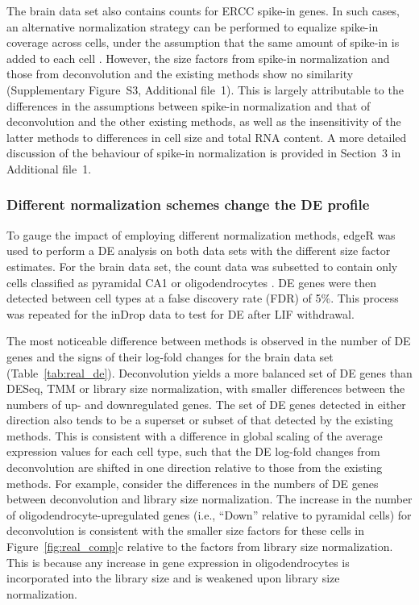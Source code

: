 \documentclass{bmcart}
\newcommand{\suppspikesec}{3}
\newcommand{\suppspikefig}{S3}
\begin{document}
The brain data set also contains counts for ERCC spike-in genes.
In such cases, an alternative normalization strategy can be performed to equalize spike-in coverage across cells, 
    under the assumption that the same amount of spike-in is added to each cell \cite{stegle2015computational}.
However, the size factors from spike-in normalization and those from deconvolution and the existing methods show no similarity (Supplementary Figure~\suppspikefig{}, Additional file~1).
This is largely attributable to the differences in the assumptions between spike-in normalization and that of deconvolution and the other existing methods,
    as well as the insensitivity of the latter methods to differences in cell size and total RNA content.
A more detailed discussion of the behaviour of spike-in normalization is provided in Section~\suppspikesec{} in Additional file~1.

\subsubsection*{Different normalization schemes change the DE profile}
To gauge the impact of employing different normalization methods, edgeR was used to perform a DE analysis on both data sets with the different size factor estimates. 
For the brain data set, the count data was subsetted to contain only cells classified as pyramidal CA1 or oligodendrocytes \cite{zeisel2015brain}.
DE genes were then detected between cell types at a false discovery rate (FDR) of 5\%.
This process was repeated for the inDrop data to test for DE after LIF withdrawal.

The most noticeable difference between methods is observed in the number of DE genes and the signs of their log-fold changes for the brain data set (Table~\ref{tab:real_de}).
Deconvolution yields a more balanced set of DE genes than DESeq, TMM or library size normalization, with smaller differences between the numbers of up- and downregulated genes.
The set of DE genes detected in either direction also tends to be a superset or subset of that detected by the existing methods.
This is consistent with a difference in global scaling of the average expression values for each cell type, 
    such that the DE log-fold changes from deconvolution are shifted in one direction relative to those from the existing methods.
For example, consider the differences in the numbers of DE genes between deconvolution and library size normalization.
The increase in the number of oligodendrocyte-upregulated genes (i.e., ``Down'' relative to pyramidal cells) for deconvolution is consistent with the smaller size factors for these cells in Figure~\ref{fig:real_comp}c relative to the factors from library size normalization.
This is because any increase in gene expression in oligodendrocytes is incorporated into the library size and is weakened upon library size normalization.
\end{document}
